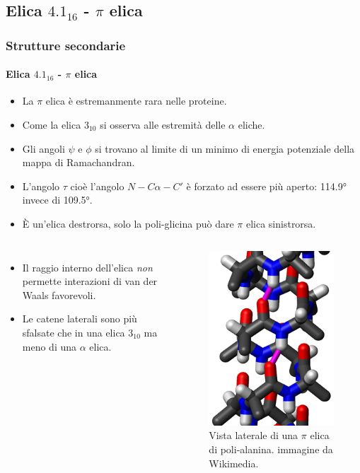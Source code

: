 \documentclass{beamer}
\begin{document}
\subsection{Elica $4.1_{16}$ - $\pi$ elica}
\begin{frame}
 \frametitle{Strutture secondarie}
  \framesubtitle{Elica $4.1_{16}$ - $\pi$ elica}
\begin{itemize}
\item La $\pi$ elica è estremanmente rara nelle proteine.
\item Come la elica $3_{10}$ si osserva alle estremità delle $\alpha$ eliche.
\pause \item Gli angoli $\psi$ e $\phi$ si trovano al limite di un minimo di energia potenziale della mappa di Ramachandran.
\item L'angolo $\tau$ cioè l'angolo $N-C\alpha-C'$ è forzato ad essere più aperto: 114.9° invece di 109.5°.
\item È un'elica destrorsa, solo la poli-glicina può dare $\pi$ elica sinistrorsa.
\end{itemize}\end{frame}\begin{frame}\begin{columns}
\begin{itemize}
\item Il raggio interno dell'elica \emph{non} permette interazioni di van der Waals favorevoli. 
\item Le catene laterali sono più sfalsate che in una elica $3_{10}$ ma meno di una $\alpha$ elica.
\end{itemize}\vskip -10pt \pause 
\begin{figure}
\includegraphics[scale=0.4]{pi_helix.png}\caption{Vista laterale di una $\pi$ elica di poli-alanina. \tiny{immagine da Wikimedia.}}
\end{figure}\end{columns}
\end{frame}
\end{document}
